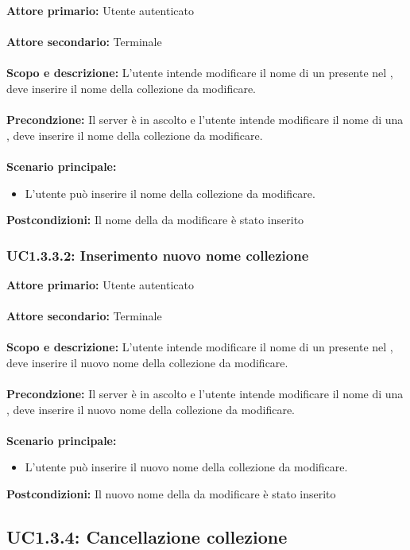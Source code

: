 \documentclass{scalatekids-article}
\begin{document}
\textbf{Attore primario:} Utente autenticato\\ \\
\textbf{Attore secondario:} Terminale\\ \\
\textbf{Scopo e descrizione:} L'utente intende modificare il nome di un  presente nel , deve inserire il nome della collezione da modificare.\\ \\
\textbf{Precondzione:} Il server è in ascolto e l'utente intende modificare il nome di una , deve inserire il nome della collezione da modificare.\\ \\
\textbf{Scenario principale:}
\begin{itemize}
\item L'utente può inserire il nome della collezione da modificare.
\end{itemize}
\textbf{Postcondizioni:} Il nome della  da modificare è stato inserito

\subsubsection{UC1.3.3.2: Inserimento nuovo nome collezione}

\textbf{Attore primario:} Utente autenticato\\ \\
\textbf{Attore secondario:} Terminale\\ \\
\textbf{Scopo e descrizione:} L'utente intende modificare il nome di un  presente nel , deve inserire il nuovo nome della collezione da modificare.\\ \\
\textbf{Precondzione:} Il server è in ascolto e l'utente intende modificare il nome di una , deve inserire il nuovo nome della collezione da modificare.\\ \\
\textbf{Scenario principale:}
\begin{itemize}
\item L'utente può inserire il nuovo nome della collezione da modificare.
\end{itemize}
\textbf{Postcondizioni:} Il nuovo nome della  da modificare è stato inserito

\subsection{UC1.3.4: Cancellazione collezione}
\end{document}
